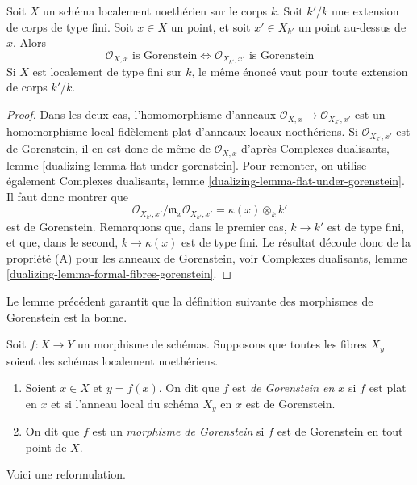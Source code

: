 \begin{lemma}
\label{lemma-gorenstein-base-change}
Soit $X$ un schéma localement noethérien sur le corps $k$. Soit $k'/k$ une extension de corps de type fini. Soit $x \in X$ un point, et soit $x' \in X_{k'}$ un point au-dessus de $x$. Alors
$$
\mathcal{O}_{X, x}\text{ is Gorenstein}
\Leftrightarrow
\mathcal{O}_{X_{k'}, x'}\text{ is Gorenstein}
$$
Si $X$ est localement de type fini sur $k$, le même énoncé vaut pour toute extension de corps $k'/k$.
\end{lemma}

\begin{proof}
Dans les deux cas, l'homomorphisme d'anneaux $\mathcal{O}_{X, x} \to \mathcal{O}_{X_{k'}, x'}$ est un homomorphisme local fidèlement plat d'anneaux locaux noethériens. Si $\mathcal{O}_{X_{k'}, x'}$ est de Gorenstein, il en est donc de même de $\mathcal{O}_{X, x}$ d'après Complexes dualisants, lemme \ref{dualizing-lemma-flat-under-gorenstein}. Pour remonter, on utilise également Complexes dualisants, lemme \ref{dualizing-lemma-flat-under-gorenstein}. Il faut donc montrer que
$$
\mathcal{O}_{X_{k'}, x'}/\mathfrak m_x \mathcal{O}_{X_{k'}, x'} =
\kappa(x) \otimes_k k'
$$
est de Gorenstein. Remarquons que, dans le premier cas, $k \to k'$ est de type fini, et que, dans le second, $k \to \kappa(x)$ est de type fini. Le résultat découle donc de la propriété (A) pour les anneaux de Gorenstein, voir Complexes dualisants, lemme \ref{dualizing-lemma-formal-fibres-gorenstein}.
\end{proof}

\noindent
Le lemme précédent garantit que la définition suivante des morphismes de Gorenstein est la bonne.

\begin{definition}
\label{definition-gorenstein-morphism}
Soit $f : X \to Y$ un morphisme de schémas. Supposons que toutes les fibres $X_y$ soient des schémas localement noethériens.
\begin{enumerate}
\item Soient $x \in X$ et $y = f(x)$. On dit que $f$ est {\it de Gorenstein en $x$} si $f$ est plat en $x$ et si l'anneau local du schéma $X_y$ en $x$ est de Gorenstein.
\item On dit que $f$ est un {\it morphisme de Gorenstein} si $f$ est de Gorenstein en tout point de $X$.
\end{enumerate}
\end{definition}

\noindent
Voici une reformulation.

